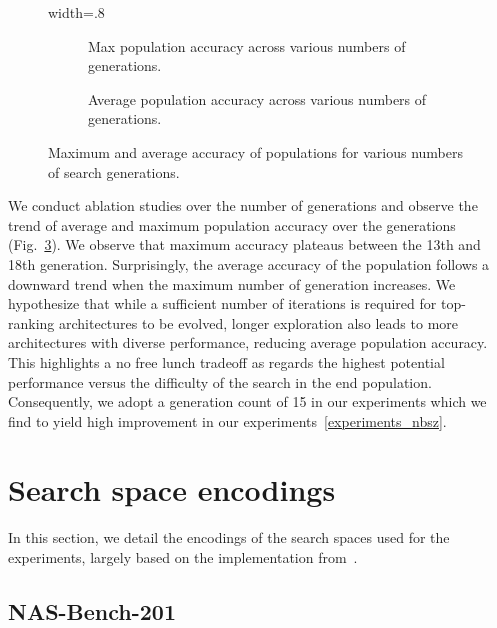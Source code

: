 \documentclass[10pt]{article} %
\begin{document}
\begin{figure}[h]
\centering
\begin{adjustbox}{width=.8\linewidth}
    \begin{subfigure}[t]{.4\textwidth}
        \resizebox{\textwidth}{!}{}
        \caption{\centering Max population accuracy across various numbers of generations.}
        \label{fig_abla_gen_max}
    \end{subfigure}%
    \hfill%
    \begin{subfigure}[t]{.4\textwidth}
        \resizebox{\textwidth}{!}{}
        \caption{\centering Average population accuracy across various numbers of generations.}
        \label{fig_abla_gen_avg}
    \end{subfigure}%
\end{adjustbox}
\caption{Maximum and average accuracy of populations for various numbers of search generations.}
\label{fig_abla_gen}
\end{figure}

We conduct ablation studies over the number of generations and observe the trend of average and maximum population accuracy over the generations (Fig.~\ref{fig_abla_gen}). We observe that maximum accuracy plateaus between the 13th and 18th generation. Surprisingly, the average accuracy of the population follows a downward trend when the maximum number of generation increases. We hypothesize that while a sufficient number of iterations is required for top-ranking architectures to be evolved, longer exploration also leads to more architectures with diverse performance, reducing average population accuracy. This highlights a no free lunch tradeoff as regards the highest potential performance versus the difficulty of the search in the end population. Consequently, we adopt a generation count of 15 in our experiments which we find to yield high improvement in our experiments~\ref{experiments_nbsz}.

\section{Search space encodings}
\label{apx_encodings}

In this section, we detail the encodings of the search spaces used for the experiments, largely based on the implementation from~\citet{krishnakumar2022bench}.

\subsection{NAS-Bench-201}
\end{document}
